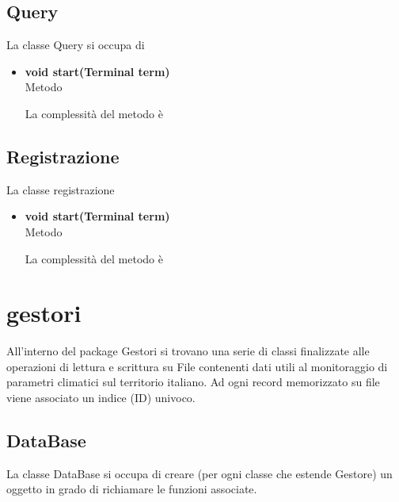\documentclass[a4paper, 12pt]{scrreprt}
\begin{document}
			\subsection{Query}
			La classe Query si occupa di 
			\begin{itemize}
				\item \textbf{void start(Terminal term)}
				\\Metodo 
				
				La complessit\`a del metodo è 
				
			\end{itemize}
			\subsection{Registrazione}
			La classe registrazione
			\begin{itemize}
				\item \textbf{void start(Terminal term)}
				\\Metodo
				
				La complessit\`a del metodo è 
				
			\end{itemize}
			
		\section{gestori}
		All'interno del package Gestori si trovano una serie di classi finalizzate alle operazioni di lettura e scrittura su File contenenti dati utili al monitoraggio di parametri climatici sul territorio italiano.
		Ad ogni record memorizzato su file viene associato un indice (ID) univoco.
			\subsection{DataBase}
			La classe DataBase si occupa di creare (per ogni classe che estende Gestore) un oggetto in grado di richiamare le funzioni associate.
\end{document}
